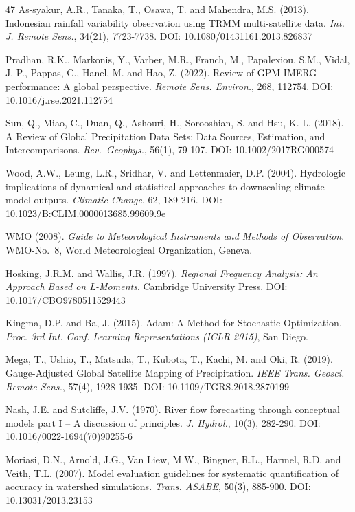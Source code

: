 \documentclass[11pt,a4paper]{article}
\begin{document}
\begin{thebibliography}{47}
 As-syakur, A.R., Tanaka, T., Osawa, T. and Mahendra, M.S.
(2013). Indonesian rainfall variability observation using TRMM
multi-satellite data. \emph{Int. J. Remote Sens.}, 34(21), 7723-7738.
DOI: 10.1080/01431161.2013.826837

 Pradhan, R.K., Markonis, Y., Varber, M.R., Franch, M.,
Papalexiou, S.M., Vidal, J.-P., Pappas, C., Hanel, M. and Hao, Z.
(2022). Review of GPM IMERG performance: A global perspective.
\emph{Remote Sens. Environ.}, 268, 112754. DOI:
10.1016/j.rse.2021.112754

 Sun, Q., Miao, C., Duan, Q., Ashouri, H., Sorooshian, S. and
Hsu, K.-L. (2018). A Review of Global Precipitation Data Sets: Data
Sources, Estimation, and Intercomparisons. \emph{Rev.~Geophys.}, 56(1),
79-107. DOI: 10.1002/2017RG000574

 Wood, A.W., Leung, L.R., Sridhar, V. and Lettenmaier, D.P.
(2004). Hydrologic implications of dynamical and statistical approaches
to downscaling climate model outputs. \emph{Climatic Change}, 62,
189-216. DOI: 10.1023/B:CLIM.0000013685.99609.9e

 WMO (2008). \emph{Guide to Meteorological Instruments and
Methods of Observation}. WMO-No.~8, World Meteorological Organization,
Geneva.

 Hosking, J.R.M. and Wallis, J.R. (1997). \emph{Regional
Frequency Analysis: An Approach Based on L-Moments}. Cambridge
University Press. DOI: 10.1017/CBO9780511529443

 Kingma, D.P. and Ba, J. (2015). Adam: A Method for Stochastic
Optimization. \emph{Proc. 3rd Int. Conf. Learning Representations (ICLR
2015)}, San Diego.

 Mega, T., Ushio, T., Matsuda, T., Kubota, T., Kachi, M. and
Oki, R. (2019). Gauge-Adjusted Global Satellite Mapping of
Precipitation. \emph{IEEE Trans. Geosci. Remote Sens.}, 57(4),
1928-1935. DOI: 10.1109/TGRS.2018.2870199

 Nash, J.E. and Sutcliffe, J.V. (1970). River flow forecasting
through conceptual models part I -- A discussion of principles. \emph{J.
Hydrol.}, 10(3), 282-290. DOI: 10.1016/0022-1694(70)90255-6

 Moriasi, D.N., Arnold, J.G., Van Liew, M.W., Bingner, R.L.,
Harmel, R.D. and Veith, T.L. (2007). Model evaluation guidelines for
systematic quantification of accuracy in watershed simulations.
\emph{Trans. ASABE}, 50(3), 885-900. DOI: 10.13031/2013.23153


\end{thebibliography}
\end{document}
